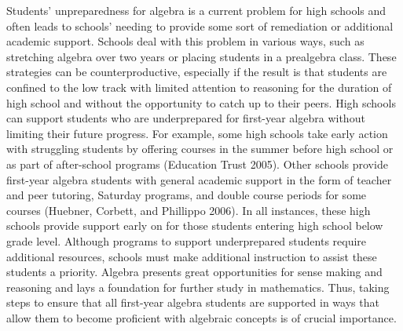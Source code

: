 \documentclass[
  10pt,
  a4paper,
  landscape,
  twoside,
  openany
]{scrbook}
\newcommand{\EN}[1]{#1}
\newcounter{example}
\begin{document}
\TriPara
{
\EN{Students' unpreparedness for algebra is a current problem for high schools and often leads to schools' needing to provide some sort of remediation or additional academic support. Schools deal with this problem in various ways, such as stretching algebra over two years or placing students in a prealgebra class. These strategies can be counterproductive, especially if the result is that students are confined to the low track with limited attention to reasoning for the duration of high school and without the opportunity to catch up to their peers. High schools can support students who are underprepared for first-year algebra without limiting their future progress. For example, some high schools take early action with struggling students by offering courses in the summer before high school or as part of after-school programs (Education Trust 2005). Other schools provide first-year algebra students with general academic support in the form of teacher and peer tutoring, Saturday programs, and double course periods for some courses (Huebner, Corbett, and Phillippo 2006). In all instances, these high schools provide support early on for those students entering high school below grade level. Although programs to support underprepared students require additional resources, schools must make additional instruction to assist these students a priority. Algebra presents great opportunities for sense making and reasoning and lays a foundation for further study in mathematics. Thus, taking steps to ensure that all first-year algebra students are supported in ways that allow them to become proficient with algebraic concepts is of crucial importance.}
}
\end{document}
